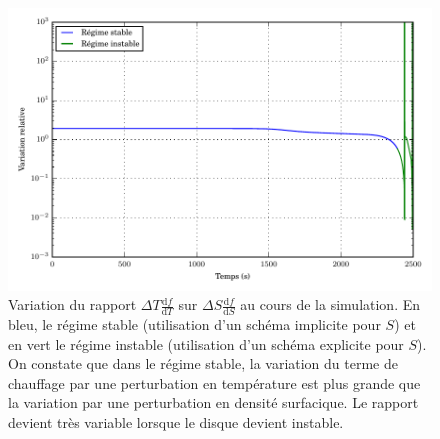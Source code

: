\begin{figure}
  \includegraphics{figures/df_dS_and_df_dT.pdf}
  \caption{Variation du rapport $\Delta T \frac{\mathrm{d} f}{\mathrm d T}$ sur $\Delta S \frac{\mathrm{d} f}{\mathrm d S}$ au cours de la simulation. En bleu, le régime stable (utilisation d'un schéma implicite pour $S$) et en vert le régime instable (utilisation d'un schéma explicite pour $S$). On constate que dans le régime stable, la variation du terme de chauffage par une perturbation en température est plus grande que la variation par une perturbation en densité surfacique. Le rapport devient très variable lorsque le disque devient instable.}
  \label{fig:df_ds_et_df_dt}
\end{figure}

